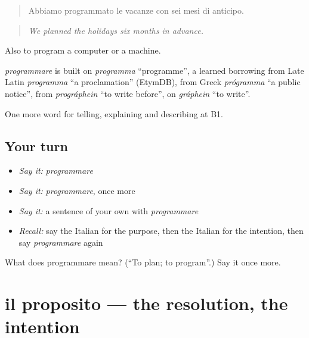\begin{quote}
Abbiamo programmato le vacanze con sei mesi di anticipo.
\end{quote}

\begin{quote}
\emph{We planned the holidays six months in advance.}
\end{quote}

Also to program a computer or a machine.

\begin{cousinweb}
\emph{programmare} is built on \emph{programma} \textquotedblleft{}programme\textquotedblright{}, a learned borrowing from Late Latin \emph{programma} \textquotedblleft{}a proclamation\textquotedblright{} (EtymDB), from Greek \emph{prógramma} \textquotedblleft{}a public notice\textquotedblright{}, from \emph{prográphein} \textquotedblleft{}to write before\textquotedblright{}, on \emph{gráphein} \textquotedblleft{}to write\textquotedblright{}.
\end{cousinweb}

\begin{grammarlens}[title={What you've built}]
One more word for telling, explaining and describing at B1.
\end{grammarlens}

\subsection*{Your turn}
\begin{itemize}
\raggedright
  \item \emph{Say it:} \emph{programmare}
  \item \emph{Say it:} \emph{programmare}, once more
  \item \emph{Say it:} a sentence of your own with \emph{programmare}
  \item \emph{Recall:} say the Italian for the purpose, then the Italian for the intention, then say \emph{programmare} again
\end{itemize}

\begin{tcolorbox}[breakable,colback=teal!4,colframe=teal!35!black,title={Before you move on}]
What does programmare mean? (\textquotedblleft{}To plan; to program\textquotedblright{}.) Say it once more.
\end{tcolorbox}
\section[il proposito]{il proposito — the resolution, the intention}


